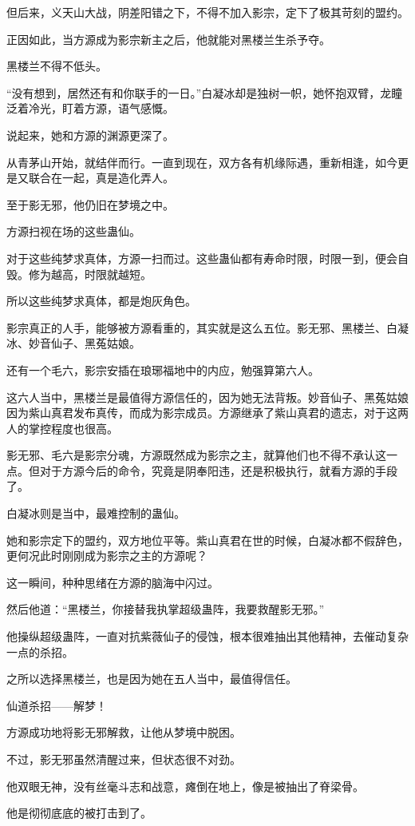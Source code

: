 \begin{this_body}
但后来，义天山大战，阴差阳错之下，不得不加入影宗，定下了极其苛刻的盟约。

正因如此，当方源成为影宗新主之后，他就能对黑楼兰生杀予夺。

黑楼兰不得不低头。

“没有想到，居然还有和你联手的一日。”白凝冰却是独树一帜，她怀抱双臂，龙瞳泛着冷光，盯着方源，语气感慨。

说起来，她和方源的渊源更深了。

从青茅山开始，就结伴而行。一直到现在，双方各有机缘际遇，重新相逢，如今更是又联合在一起，真是造化弄人。

至于影无邪，他仍旧在梦境之中。

方源扫视在场的这些蛊仙。

对于这些纯梦求真体，方源一扫而过。这些蛊仙都有寿命时限，时限一到，便会自毁。修为越高，时限就越短。

所以这些纯梦求真体，都是炮灰角色。

影宗真正的人手，能够被方源看重的，其实就是这么五位。影无邪、黑楼兰、白凝冰、妙音仙子、黑菟姑娘。

还有一个毛六，影宗安插在琅琊福地中的内应，勉强算第六人。

这六人当中，黑楼兰是最值得方源信任的，因为她无法背叛。妙音仙子、黑菟姑娘因为紫山真君发布真传，而成为影宗成员。方源继承了紫山真君的遗志，对于这两人的掌控程度也很高。

影无邪、毛六是影宗分魂，方源既然成为影宗之主，就算他们也不得不承认这一点。但对于方源今后的命令，究竟是阴奉阳违，还是积极执行，就看方源的手段了。

白凝冰则是当中，最难控制的蛊仙。

她和影宗定下的盟约，双方地位平等。紫山真君在世的时候，白凝冰都不假辞色，更何况此时刚刚成为影宗之主的方源呢？

这一瞬间，种种思绪在方源的脑海中闪过。

然后他道：“黑楼兰，你接替我执掌超级蛊阵，我要救醒影无邪。”

他操纵超级蛊阵，一直对抗紫薇仙子的侵蚀，根本很难抽出其他精神，去催动复杂一点的杀招。

之所以选择黑楼兰，也是因为她在五人当中，最值得信任。

仙道杀招——解梦！

方源成功地将影无邪解救，让他从梦境中脱困。

不过，影无邪虽然清醒过来，但状态很不对劲。

他双眼无神，没有丝毫斗志和战意，瘫倒在地上，像是被抽出了脊梁骨。

他是彻彻底底的被打击到了。


\end{this_body}
